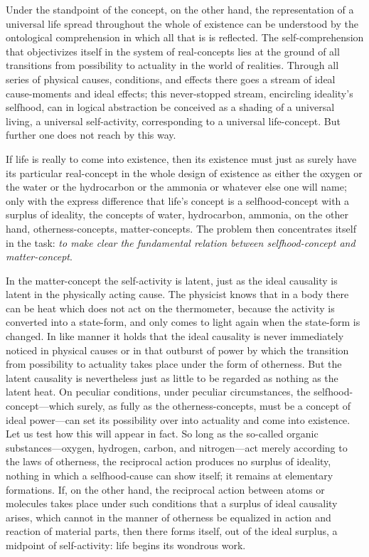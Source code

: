 \documentclass[12pt]{article}
\begin{document}
Under the standpoint of the concept, on the other hand, the representation of
a universal life spread throughout the whole of existence can be understood
by the ontological comprehension in which all that is is reflected. The
self-comprehension that objectivizes itself in the system of real-concepts
lies at the ground of all transitions from possibility to actuality in the
world of realities. Through all series of physical causes, conditions, and
effects there goes a stream of ideal cause-moments and ideal effects; this
never-stopped stream, encircling ideality's selfhood, can in logical
abstraction be conceived as a shading of a universal living, a universal
self-activity, corresponding to a universal life-concept. But further one
does not reach by this way.

If life is really to come into existence, then its existence must just as
surely have its particular real-concept in the whole design of existence as
either the oxygen or the water or the hydrocarbon or the
ammonia or whatever else one will name; only with the express difference that
life's concept is a selfhood-concept with a surplus of ideality, the
concepts of water, hydrocarbon, ammonia, on the other hand,
otherness-concepts, matter-concepts. The problem then concentrates itself in
the task: \emph{to make clear the fundamental relation between
selfhood-concept and matter-concept}.

In the matter-concept the self-activity is latent, just as the ideal
causality is latent in the physically acting cause. The physicist knows that
in a body there can be heat which does not act on the thermometer, because
the activity is converted into a state-form, and only comes to light again
when the state-form is changed. In like manner it holds that the ideal
causality is never immediately noticed in physical causes or in that
outburst of power by which the transition from possibility to actuality takes
place under the form of otherness. But the latent causality is nevertheless
just as little to be regarded as nothing as the latent heat. On peculiar
conditions, under peculiar circumstances, the selfhood-concept—which surely,
as fully as the otherness-concepts, must be a concept of ideal power—can set
its possibility over into actuality and come into existence. Let us test how
this will appear in fact. So long as the so-called organic substances—oxygen,
hydrogen, carbon, and nitrogen—act merely according to the laws of
otherness, the reciprocal action produces no surplus of ideality, nothing in
which a selfhood-cause can show itself; it remains at elementary formations.
If, on the other hand, the reciprocal action between atoms or molecules takes
place under such conditions that a surplus of ideal causality arises, which
cannot in the manner of otherness be equalized in action and reaction of
material parts, then there forms itself, out of the ideal surplus, a midpoint
of self-activity: life begins its wondrous work.
\end{document}
